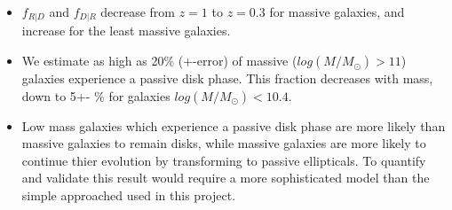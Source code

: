 \begin{itemize}

\item{$f_{R|D}$ and $f_{D|R}$ decrease from $z=1$ to $z=0.3$ for massive galaxies, and increase for the least massive galaxies.}

\item{We estimate as high as 20\% (+-error) of massive ($log(M/M_{\odot})>11$) galaxies experience a passive disk phase. This fraction decreases with mass, down to 5+- \% for galaxies $log(M/M_{\odot})<10.4$.}

\item{Low mass galaxies which experience a passive disk phase are more likely than massive galaxies to remain disks, while massive galaxies are more likely to continue thier evolution by transforming to passive ellipticals. To quantify and validate this result would require a more sophisticated model than the simple approached used in this project.}


\end{itemize}



